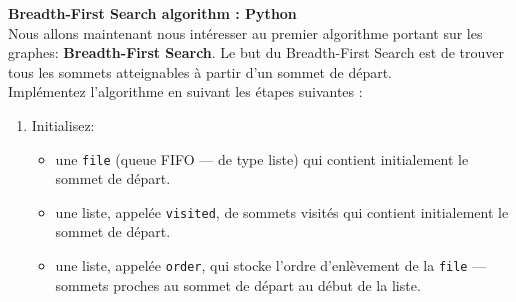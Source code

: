 \begin{Exercice}[10 minutes]
\begin{solution}
    \end{solution}

\end{Exercice}


\begin{Exercice}[20 minutes]  \textbf{Breadth-First Search algorithm : Python}\\
    Nous allons maintenant nous intéresser au premier algorithme portant sur les graphes\!: \textbf{Breadth-First Search}. Le but du Breadth-First Search est de trouver tous les sommets atteignables à partir d'un sommet de départ.\\

    Implémentez l'algorithme en suivant les étapes suivantes :\\
\begin{enumerate}
    
    
    

\item Initialisez\!:
\begin{itemize}
    \item une \texttt{file} (queue FIFO — de type liste) qui contient initialement le sommet de départ.
    \item une liste, appelée \texttt{visited}, de sommets visités qui contient initialement le sommet de départ.
    \item une liste, appelée \texttt{order}, qui stocke l'ordre d'enlèvement de la \texttt{file} — sommets proches au sommet de départ au début de la liste.
\end{itemize}


\end{enumerate}
\end{Exercice}
